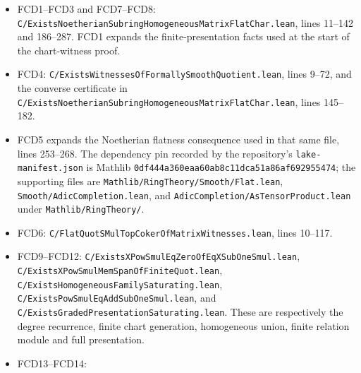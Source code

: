 \documentclass[11pt,a4paper]{article}
\numberwithin{equation}{section}
\theoremstyle{remark}\newtheorem{remark}[theorem]{Remark}
\begin{document}
\begin{itemize}
\item FCD1--FCD3 and FCD7--FCD8:
\texttt{C/\allowbreak{}Exists\allowbreak{}Noetherian\allowbreak{}Subring\allowbreak{}Homogeneous\allowbreak{}Matrix\allowbreak{}Flat\allowbreak{}Char.lean},
lines 11--142 and 186--287.  FCD1 expands the finite-presentation
facts used at the start of the chart-witness proof.
\item FCD4:
\texttt{C/\allowbreak{}Exists\allowbreak{}Witnesses\allowbreak{}Of\allowbreak{}Formally\allowbreak{}Smooth\allowbreak{}Quotient.lean},
lines 9--72, and the converse certificate in
\texttt{C/\allowbreak{}Exists\allowbreak{}Noetherian\allowbreak{}Subring\allowbreak{}Homogeneous\allowbreak{}Matrix\allowbreak{}Flat\allowbreak{}Char.lean},
lines 145--182.
\item FCD5 expands the Noetherian flatness consequence used in that
same file, lines 253--268.  The dependency pin recorded by the
repository's \texttt{lake-manifest.\allowbreak json} is Mathlib
\texttt{0df444a360eaa60ab8c11dca51a86af692955474}; the supporting
files are \texttt{Mathlib/\allowbreak{}Ring\allowbreak{}Theory/\allowbreak{}Smooth/\allowbreak{}Flat.lean},
\texttt{Smooth/\allowbreak{}Adic\allowbreak{}Completion.lean}, and
\texttt{Adic\allowbreak{}Completion/\allowbreak{}As\allowbreak{}Tensor\allowbreak{}Product.lean} under
\texttt{Mathlib/\allowbreak Ring\allowbreak Theory/\allowbreak }.
\item FCD6:
\texttt{C/\allowbreak{}Flat\allowbreak{}Quot\allowbreak{}SMul\allowbreak{}Top\allowbreak{}Coker\allowbreak{}Of\allowbreak{}Matrix\allowbreak{}Witnesses.lean}, lines 10--117.
\item FCD9--FCD12:
\texttt{C/\allowbreak{}Exists\allowbreak{}XPow\allowbreak{}Smul\allowbreak{}Eq\allowbreak{}Zero\allowbreak{}Of\allowbreak{}Eq\allowbreak{}XSub\allowbreak{}One\allowbreak{}Smul.lean},
\texttt{C/\allowbreak{}Exists\allowbreak{}XPow\allowbreak{}Smul\allowbreak{}Mem\allowbreak{}Span\allowbreak{}Of\allowbreak{}Finite\allowbreak{}Quot.lean},
\texttt{C/\allowbreak{}Exists\allowbreak{}Homogeneous\allowbreak{}Family\allowbreak{}Saturating.lean},
\texttt{C/\allowbreak{}Exists\allowbreak{}Pow\allowbreak{}Smul\allowbreak{}Eq\allowbreak{}Add\allowbreak{}Sub\allowbreak{}One\allowbreak{}Smul.lean}, and
\texttt{C/\allowbreak{}Exists\allowbreak{}Graded\allowbreak{}Presentation\allowbreak{}Saturating.lean}.
These are respectively the degree recurrence, finite chart generation,
homogeneous union, finite relation module and full presentation.
\item FCD13--FCD14:

\end{itemize}
\end{document}
